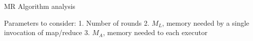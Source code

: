\documentclass[a4paper]{tufte-handout} %
\begin{document}
MR Algorithm analysis

Parameters to consider:
1. Number of rounds
2. $M_L$, memory needed by a single invocation of map/reduce
3. $M_A$, memory needed to each executor



\newpage




\end{document}
